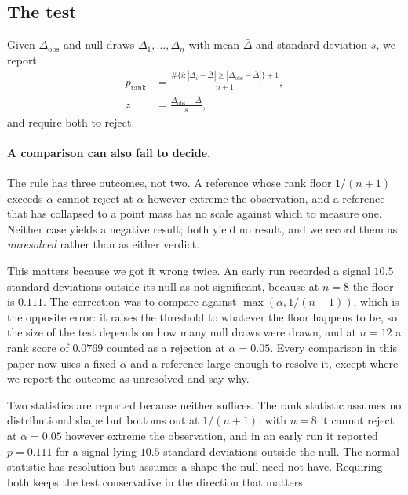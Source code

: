 \documentclass[10pt,twocolumn]{article}
\begin{document}
\subsection{The test}

Given $\Delta_{\mathrm{obs}}$ and null draws $\Delta_1,\dots,\Delta_n$ with mean
$\bar\Delta$ and standard deviation $s$, we report
\begin{align}
p_{\mathrm{rank}} &= \frac{\#\{i : |\Delta_i - \bar\Delta| \ge |\Delta_{\mathrm{obs}} - \bar\Delta|\} + 1}{n+1}, \\[2pt]
z &= \frac{\Delta_{\mathrm{obs}} - \bar\Delta}{s},
\end{align}
and require both to reject.

\paragraph{A comparison can also fail to decide.}
The rule has three outcomes, not two. A reference whose rank floor $1/(n+1)$
exceeds $\alpha$ cannot reject at $\alpha$ however extreme the observation, and
a reference that has collapsed to a point mass has no scale against which to
measure one. Neither case yields a negative result; both yield no result, and we
record them as \emph{unresolved} rather than as either verdict.

This matters because we got it wrong twice. An early run recorded a signal
$10.5$ standard deviations outside its null as not significant, because at $n=8$
the floor is $0.111$. The correction was to compare against
$\max(\alpha, 1/(n+1))$, which is the opposite error: it raises the threshold to
whatever the floor happens to be, so the size of the test depends on how many
null draws were drawn, and at $n=12$ a rank score of $0.0769$ counted as a
rejection at $\alpha=0.05$. Every comparison in this paper now uses a fixed
$\alpha$ and a reference large enough to resolve it, except where we report the
outcome as unresolved and say why.

Two statistics are reported because neither suffices. The rank statistic assumes
no distributional shape but bottoms out at $1/(n+1)$: with $n=8$ it cannot reject
at $\alpha=0.05$ however extreme the observation, and in an early run it reported
$p=0.111$ for a signal lying $10.5$ standard deviations outside the null. The
normal statistic has resolution but assumes a shape the null need not have.
Requiring both keeps the test conservative in the direction that matters.
\end{document}
